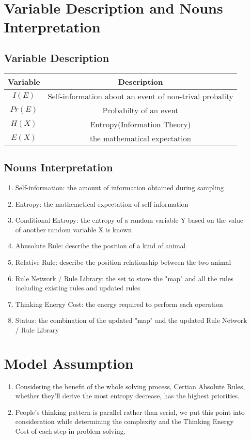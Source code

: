 \section{Variable Description and Nouns Interpretation}

\subsection{Variable Description}
\begin{tabular}{|c|c|}
\hline 
Variable&Description\\
\hline  
$I(E)$ & Self-information about an event of non-trival probality\\
\hline 
$Pr(E)$ & Probabilty of an event\\
\hline
$H(X)$ & Entropy(Information Theory)\\
\hline
$E(X)$ & the mathematical expectation\\
\hline
\end{tabular}
\subsection{Nouns Interpretation}
\begin{enumerate}[(1)]
\item Self-information: the amount of information obtained during sampling
\item Entropy: the mathemetical expectation of self-information
\item Conditional Entropy: the entropy of a random variable Y based on the value of another random variable X is known
\item Abusolute Rule: describe the position of a kind of animal
\item Relative Rule: describe the position relationship between the two animal
\item Rule Network / Rule Library: the set to store the "map" and all the rules including existing rules and updated rules
\item Thinking Energy Cost: the energy required to perform each operation
\item Status: the combination of the updated "map" and the updated Rule Network / Rule Library

\end{enumerate}
\section{Model Assumption}
\begin{enumerate}[(1)]
\item Considering the benefit of the whole solving process, Certian Absolute Rules, whether they'll derive the most entropy decrease, has the highest priorities.
\item People's thinking pattern is parallel rather than serial, we put this point into consideration while determining the complexity and the Thinking Energy Cost of each step in problem solving.
\end{enumerate}
